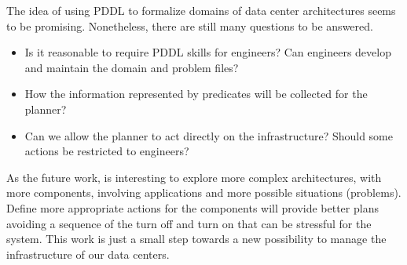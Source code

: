 \documentclass[letterpaper]{article}
\begin{document}

The idea of using PDDL to formalize domains of data center architectures seems to be promising. Nonetheless, there are still many questions to be answered.

\begin{itemize}
    \item Is it reasonable to require PDDL skills for engineers? Can engineers develop and maintain the domain and problem files? 
    \item How the information represented by predicates will be collected for the planner?
    \item Can we allow the planner to act directly on the infrastructure? Should some actions be restricted to engineers?
\end{itemize}

As the future work, is interesting to explore more complex architectures, with more components, involving applications and more possible situations (problems). Define more appropriate actions for the components will provide better plans avoiding a sequence of the turn off and turn on that can be stressful for the system. This work is just a small step towards a new possibility to manage the infrastructure of our data centers.



\end{document}
